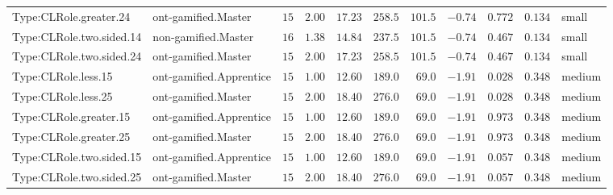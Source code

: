\documentclass[6pt,a4paper]{article}
\begin{document}
{\begin{longtable}{llrrrrrrrrl}
Type:CLRole.greater.24&ont-gamified.Master&$15$&$2.00$&$17.23$&$ 258.5$&$101.5$&$-0.74$&$0.772$&$0.134$&small\tabularnewline
Type:CLRole.two.sided.14&non-gamified.Master&$16$&$1.38$&$14.84$&$ 237.5$&$101.5$&$-0.74$&$0.467$&$0.134$&small\tabularnewline
Type:CLRole.two.sided.24&ont-gamified.Master&$15$&$2.00$&$17.23$&$ 258.5$&$101.5$&$-0.74$&$0.467$&$0.134$&small\tabularnewline
Type:CLRole.less.15&ont-gamified.Apprentice&$15$&$1.00$&$12.60$&$ 189.0$&$ 69.0$&$-1.91$&$0.028$&$0.348$&medium\tabularnewline
Type:CLRole.less.25&ont-gamified.Master&$15$&$2.00$&$18.40$&$ 276.0$&$ 69.0$&$-1.91$&$0.028$&$0.348$&medium\tabularnewline
Type:CLRole.greater.15&ont-gamified.Apprentice&$15$&$1.00$&$12.60$&$ 189.0$&$ 69.0$&$-1.91$&$0.973$&$0.348$&medium\tabularnewline
Type:CLRole.greater.25&ont-gamified.Master&$15$&$2.00$&$18.40$&$ 276.0$&$ 69.0$&$-1.91$&$0.973$&$0.348$&medium\tabularnewline
\newpage
Type:CLRole.two.sided.15&ont-gamified.Apprentice&$15$&$1.00$&$12.60$&$ 189.0$&$ 69.0$&$-1.91$&$0.057$&$0.348$&medium\tabularnewline
Type:CLRole.two.sided.25&ont-gamified.Master&$15$&$2.00$&$18.40$&$ 276.0$&$ 69.0$&$-1.91$&$0.057$&$0.348$&medium\tabularnewline
\hline
\end{longtable}}
\end{document}
